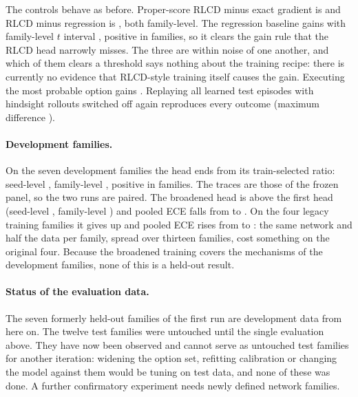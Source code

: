 \documentclass[10pt]{article}
\begin{document}
The controls behave as before. Proper-score RLCD minus exact gradient is \TypedBroadTestOodRlcdVsExact{} \TypedBroadTestOodRlcdVsExactT{} and RLCD minus regression is \TypedBroadTestOodRlcdVsRegress{} \TypedBroadTestOodRlcdVsRegressT{}, both family-level. The regression baseline gains \TypedBroadTestOodRegressVsTrain{} with family-level $t$ interval \TypedBroadTestOodRegressVsTrainT{}, positive in \TypedBroadTestOodRegressVsTrainPositive{} families, so it clears the gain rule that the RLCD head narrowly misses. The three are within noise of one another, and which of them clears a threshold says nothing about the training recipe: there is currently no evidence that RLCD-style training itself causes the gain. Executing the most probable option gains \TypedBroadTestOodMapVsTrain{}. Replaying all \TypedBroadTestReplayEpisodes{} learned test episodes with hindsight rollouts switched off again reproduces every outcome (maximum difference \TypedBroadTestReplayDifference{}).

\paragraph{Development families.}
On the seven development families the head ends \TypedBroadDevOodBayesVsTrain{} from its train-selected ratio: seed-level \TypedBroadDevOodBayesVsTrainSeed{}, family-level \TypedBroadDevOodBayesVsTrainT{}, positive in \TypedBroadDevOodBayesVsTrainPositive{} families. The traces are those of the frozen panel, so the two runs are paired. The broadened head is \TypedBroadDevOodPairedBayes{} above the first head (seed-level \TypedBroadDevOodPairedBayesSeed{}, family-level \TypedBroadDevOodPairedBayesT{}) and pooled ECE falls from \TypedAuditOodBayesEce{} to \TypedBroadDevOodBayesEce{}. On the four legacy training families it gives up \TypedBroadDevIdPairedBayes{} \TypedBroadDevIdPairedBayesSeed{} and pooled ECE rises from \TypedAuditIdBayesEce{} to \TypedBroadDevIdBayesEce{}: the same network and half the data per family, spread over thirteen families, cost something on the original four. Because the broadened training covers the mechanisms of the development families, none of this is a held-out result.

\paragraph{Status of the evaluation data.}
The seven formerly held-out families of the first run are development data from here on. The twelve test families were untouched until the single evaluation above. They have now been observed and cannot serve as untouched test families for another iteration: widening the option set, refitting calibration or changing the model against them would be tuning on test data, and none of these was done. A further confirmatory experiment needs newly defined network families.
\end{document}
